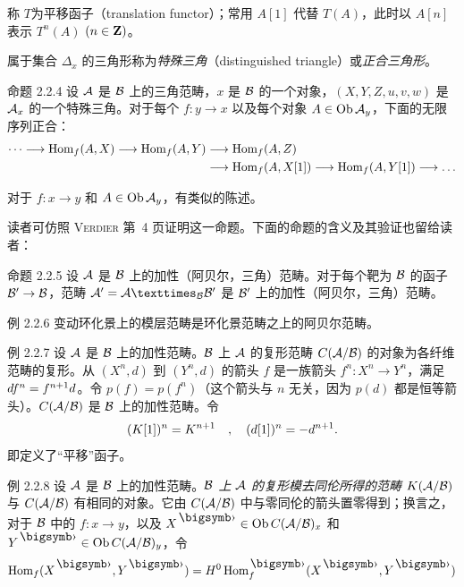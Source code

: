 称 $T$\pageoriginale 为平移函子（translation functor）；常用 $A[1]$ 代替 $T(A)$，此时以 $A[n]$ 表示 $T^{n}(A)$ $(n\in\ZZ)$。

属于集合 $\Delta_x$ 的三角形称为\emph{特殊三角}（distinguished triangle）或\emph{正合三角形}。

\begin{enonce*}{命题 2.2.4}
设 $\Aa$ 是 $\Bb$ 上的三角范畴，$x$ 是 $\Bb$ 的一个对象，$(X,Y,Z,u,v,w)$ 是 $\Aa_x$ 的一个特殊三角。对于每个 $f:y\rightarrow x$ 以及每个对象 $A\in
\Ob \Aa_y$，下面的无限序列正合：
\begin{align*}
\ldots  \longrightarrow \Hom_f(A,X) \longrightarrow \Hom_f(A,Y)&\longrightarrow
\Hom_f(A,Z)\\
 & \longrightarrow \Hom_f(A,X[1])\longrightarrow
\Hom_f(A,Y[1])\longrightarrow\ldots
\end{align*}
\end{enonce*}

对于 $f:x\rightarrow y$ 和 $A\in \Ob \Aa_y$，有类似的陈述。

读者可仿照 \textsc{Verdier} \cite{sga4.exp.XVII.bib.CD} 第~4 页证明这一命题。下面的命题的含义及其验证也留给读者：

\begin{enonce*}{命题 2.2.5}
设 $\Aa$ 是 $\Bb$ 上的加性（\resp 阿贝尔，\resp 三角）范畴。对于每个靶为 $\Bb$ 的函子 $\Bb'\rightarrow \Bb$，范畴 $\Aa'=\fprod{\Aa}{\Bb'}{\Bb}$ 是 $\Bb'$ 上的加性（\resp 阿贝尔，\resp 三角）范畴。
\end{enonce*}

\begin{enonce*}[remark]{例 2.2.6}
变动环化景上的模层范畴是环化景范畴之上的阿贝尔范畴。
\end{enonce*}

\begin{enonce*}[remark]{例 2.2.7}
设 $\Aa$ 是 $\Bb$ 上的加性范畴。$\Bb$ 上 $\Aa$ 的复形范畴 $C(\Aa/\Bb)$ 的对象为各纤维范畴的复形。从 $(X^n,d)$ 到 $(Y^n,d)$ 的箭头 $f$ 是一族\pageoriginale 箭头 $f^{n}:X^{n}\rightarrow Y^{n}$，满足 $\sisi{fd}{df}^{n}=f^{n+1} d$。令 $p(f)=p(f^{n})$（这个箭头与 $n$ 无关，因为 $p(d)$ 都是恒等箭头）。$C(\Aa/\Bb)$ 是 $\Bb$ 上的加性范畴。令
\[
(K[1])^{n}=K^{n+1}\quav (d[1])\sisi{_n}{^n}=-d\sisi{_{n+1}}{^{n+1}}{\quoi}.
\]
即定义了“平移”函子。
\end{enonce*}

\begin{enonce*}[remark]{例 2.2.8}
设 $\Aa$ 是 $\Bb$ 上的加性范畴。\emph{$\Bb$ 上 $\Aa$ 的复形模去同伦所得的范畴 $K(\Aa/\Bb)$} 与 $C(\Aa/\Bb)$ 有相同的对象。它由 $C(\Aa/\Bb)$ 中与零同伦的箭头置零得到；换言之，对于 $\Bb$ 中的 $f:x\rightarrow y$，以及 $X^{\bigdot}\in \Ob C(\Aa/\Bb)_x$ 和 $Y^{\bigdot}\in
\Ob C(\Aa/\Bb)_y$，令
\[
\Hom_f(X^{\bigdot},
Y^{\bigdot})=H^{0}\Hom^{\bigdot}_f(X^{\bigdot},Y^{\bigdot})
\]
\end{enonce*}

